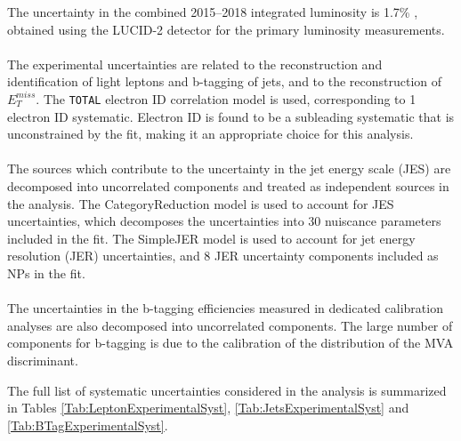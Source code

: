 The uncertainty in the combined 2015--2018 integrated luminosity is 1.7\% \cite{ATLAS:2019pzw}, obtained using the LUCID-2 detector \cite{LUCID2} for the primary luminosity measurements.

\paragraph{}
The experimental uncertainties are related to the reconstruction and identification of light leptons and b-tagging of jets, and to the reconstruction of $E^{miss}_T$. The \verb!TOTAL! electron ID correlation model is used, corresponding to 1 electron ID systematic. Electron ID is found to be a subleading systematic that is unconstrained by the fit, making it an appropriate choice for this analysis.

\paragraph{}
The sources which contribute to the uncertainty in the jet energy scale (JES) \cite{jes} are decomposed into uncorrelated components and treated as independent sources in the analysis. The CategoryReduction model is used to account for JES uncertainties, which decomposes the uncertainties into 30 nuiscance parameters included in the fit. The SimpleJER model is used to account for jet energy resolution (JER) uncertainties, and 8 JER uncertainty components included as NPs in the fit. 

\paragraph{}
The uncertainties in the b-tagging efficiencies measured in dedicated calibration analyses \cite{btag_cal} are also decomposed into uncorrelated components. The large number of components for b-tagging is due to the calibration of the distribution of the MVA discriminant.  


The full list of systematic uncertainties considered in the analysis is summarized in Tables
\ref{Tab:LeptonExperimentalSyst}, \ref{Tab:JetsExperimentalSyst} and \ref{Tab:BTagExperimentalSyst}.

